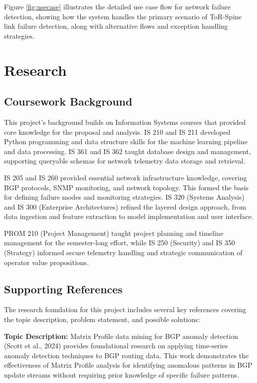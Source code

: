 \documentclass[11pt]{article}
\begin{document}
Figure \ref{fig:usecase} illustrates the detailed use case flow for network failure detection, showing how the system handles the primary scenario of ToR-Spine link failure detection, along with alternative flows and exception handling strategies.

\section{Research}

\subsection{Coursework Background}

This project's background builds on Information Systems courses that provided core knowledge for the proposal and analysis. IS 210 and IS 211 developed Python programming and data structure skills for the machine learning pipeline and data processing. IS 361 and IS 362 taught database design and management, supporting queryable schemas for network telemetry data storage and retrieval.

IS 205 and IS 260 provided essential network infrastructure knowledge, covering BGP protocols, SNMP monitoring, and network topology. This formed the basis for defining failure modes and monitoring strategies. IS 320 (Systems Analysis) and IS 300 (Enterprise Architectures) refined the layered design approach, from data ingestion and feature extraction to model implementation and user interface.

PROM 210 (Project Management) taught project planning and timeline management for the semester-long effort, while IS 250 (Security) and IS 350 (Strategy) informed secure telemetry handling and strategic communication of operator value propositions.

\subsection{Supporting References}

The research foundation for this project includes several key references covering the topic description, problem statement, and possible solutions:

\textbf{Topic Description:} Matrix Profile data mining for BGP anomaly detection (Scott et al., 2024) provides foundational research on applying time-series anomaly detection techniques to BGP routing data. This work demonstrates the effectiveness of Matrix Profile analysis for identifying anomalous patterns in BGP update streams without requiring prior knowledge of specific failure patterns.
\end{document}
